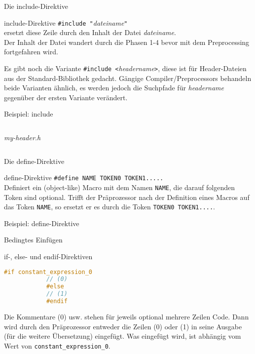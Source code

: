 \begin{frame}[fragile]{Die include-Direktive}
	\begin{block}{include-Direktive}
		\verb|#include "|\emph{dateiname}\verb|"| \\
		ersetzt diese Zeile durch den Inhalt der Datei \emph{dateiname}. \\
		Der Inhalt der Datei wandert durch die Phasen 1-4 bevor mit dem Preprocessing fortgefahren wird.
	\end{block}
	
	\pause
	\vspace{1em}
	
	Es gibt noch die Variante \verb|#include <|\emph{headername}\verb|>|, diese ist für Header-Dateien aus der Standard-Bibliothek gedacht. Gängige Compiler/Preprocessors behandeln beide Varianten ähnlich, es werden jedoch die Suchpfade für \emph{headername} gegenüber der ersten Variante verändert.
\end{frame}

\begin{frame}{Beispiel: include}
	\footnotesize
	
	\begin{columns}
		\emph{my-header.h}
		
		
		
	\end{columns}
\end{frame}

\begin{frame}[fragile]{Die define-Direktive}
	\begin{block}{define-Direktive}
		\verb|#define NAME TOKEN0 TOKEN1.....| \\
		Definiert ein (object-like) Macro mit dem Namen \verb|NAME|, die darauf folgenden Token sind optional. Trifft der Präprozessor nach der Definition eines Macros auf das Token \verb|NAME|, so ersetzt er es durch die Token \verb|TOKEN0 TOKEN1....|.
	\end{block}
\end{frame}

\begin{frame}{Beispiel: define-Direktive}
	\footnotesize
	
\end{frame}

\begin{frame}[fragile]{Bedingtes Einfügen}
	\begin{block}{if-, else- und endif-Direktiven}
		\begin{lstlisting}[language=C++]
			#if constant_expression_0
			// (0)
			#else
			// (1)
			#endif
		\end{lstlisting}
		Die Kommentare (0) usw. stehen für jeweils optional mehrere Zeilen Code.
		Dann wird durch den Präprozessor entweder die Zeilen (0) oder (1) in seine Ausgabe (für die weitere Übersetzung) eingefügt. Was eingefügt wird, ist abhängig vom Wert von \verb|constant_expression_0|.
	\end{block}
\end{frame}

